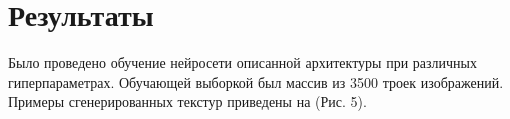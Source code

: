 \documentclass[a4paper]{article}
\begin{document}
	\section{Результаты}
		Было проведено обучение нейросети описанной архитектуры при различных гиперпараметрах. Обучающей выборкой был массив из 3500 троек изображений. Примеры сгенерированных текстур приведены на (Рис. 5).
		\begin{figure}
				\begin{minipage}{0.3\linewidth}
				\end{minipage}
				\hfill
				\begin{minipage}{0.3\linewidth}

\end{minipage}
\end{figure}
\end{document}
